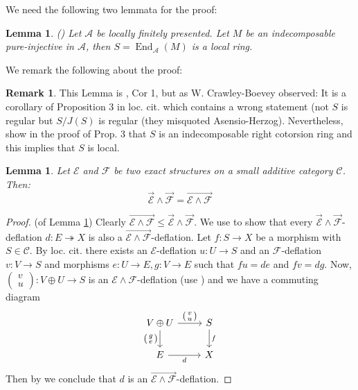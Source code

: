 \documentclass[11pt,a4paper]{amsart}
\theoremstyle{plain}
\newtheorem{lem}[thm]{Lemma}
\theoremstyle{definition}
\newtheorem{rem}[thm]{Remark}
\DeclareMathOperator{\End}{End}
\newcommand{\defl}{\twoheadrightarrow}
\newcommand{\mcA}{\mathcal{A}}
\newcommand{\mcC}{\mathcal{C}}
\newcommand{\mcE}{\mathcal{E}}
\newcommand{\mcF}{\mathcal{F}}
\begin{document}
We need the following two lemmata for the proof: 
\begin{lem} \label{End}(\cite[Cor 1]{BeG}) Let $\mcA$ be locally finitely presented. 
Let $M$ be an indecomposable pure-injective in $\mcA$, then 
$S=\End_{\mcA} (M)$ is a local ring. 
\end{lem}
We remark the following about the proof: 
\begin{rem} 
This Lemma is \cite{BeG}, Cor 1, but as W. Crawley-Boevey observed: It is a corollary of Proposition 3 in loc. cit. which contains a wrong statement (not $S$ is regular but $S/J(S)$ is regular (they misquoted Asensio-Herzog). Nevertheless, \cite{BeG} show in the proof of Prop. 3 that $S$ is an indecomposable right cotorsion ring and this implies that $S$ is local.  
\end{rem}

\begin{lem} \label{meets}
Let $\mcE$ and $\mcF$ be two exact structures on a small additive category $\mcC$. Then:   
\[\overrightarrow{\mcE}\wedge \overrightarrow{\mcF} =\overrightarrow{\mcE\wedge\mcF}\]
\end{lem}
\begin{proof} (of Lemma \ref{meets}) Clearly $\overrightarrow{\mcE\wedge \mcF}\leq \overrightarrow{\mcE}\wedge \overrightarrow{\mcF}$. 
We use \cite[Lemma 1.5]{P-locCoh} to show that every 
$\overrightarrow{\mcE}\wedge \overrightarrow{\mcF}$-deflation $d\colon E\defl X$ is also a $\overrightarrow{\mcE\wedge \mcF}$-deflation. Let $f\colon S\to X$ be a morphism with $S\in \mcC$. By loc. cit. there exists an $\mcE$-deflation $u \colon U \to S$ and an $\mcF$-deflation $v\colon V \to S$ and morphisms $e\colon U \to E, g\colon V \to E$ such that 
$fu=de$ and $fv=dg$. Now, $\left(\begin{smallmatrix} v\\u \end{smallmatrix} \right)\colon V\oplus U \to S$ is an $\mcE\wedge \mcF$-deflation (use \cite[Prop. 2.12]{Bue}) and we have a commuting diagram 
\[
\begin{tikzcd}
V\oplus U \arrow[r, "\left(\begin{smallmatrix} v \\u \end{smallmatrix}\right)"] \arrow[d, "\left(\begin{smallmatrix}g\\e\end{smallmatrix}\right)"'] & S \arrow[d, "f"] \\
E \arrow[r, "d"']                                                                                                                                  & X               
\end{tikzcd}
\]
Then by \cite[Lem. 1.5]{P-locCoh} we conclude that $d$ is an $\overrightarrow{\mcE\wedge \mcF}$-deflation.
\end{proof}
\end{document}
